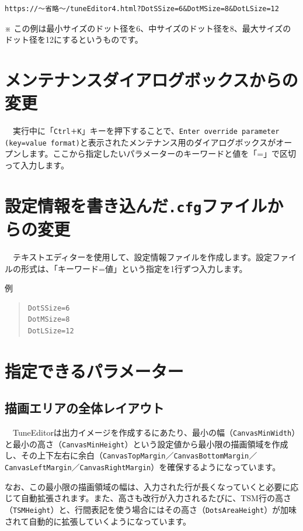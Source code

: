 \begin{verbatim}
https://〜省略〜/tuneEditor4.html?DotSSize=6&DotMSize=8&DotLSize=12
\end{verbatim}

※ この例は最小サイズのドット径を6、中サイズのドット径を8、最大サイズのドット径を12にするというものです。


\section{メンテナンスダイアログボックスからの変更}

　実行中に「\texttt{Ctrl＋K}」キーを押下することで、\texttt{Enter override parameter (key=value format)}と表示されたメンテナンス用のダイアログボックスがオープンします。ここから指定したいパラメーターのキーワードと値を「=」で区切って入力します。


\section{設定情報を書き込んだ\texttt{.cfg}ファイルからの変更}

　テキストエディターを使用して、設定情報ファイルを作成します。設定ファイルの形式は、「\textsf{キーワード}=\textsf{値}」という指定を1行ずつ入力します。

\textsf{例}
\begin{quote}
\begin{verbatim}
DotSSize=6
DotMSize=8
DotLSize=12
\end{verbatim}
\end{quote}


\section{指定できるパラメーター}\label{Parameters}

\subsection{描画エリアの全体レイアウト}

　TuneEditorは出力イメージを作成するにあたり、最小の幅（\texttt{CanvasMinWidth}）と最小の高さ（\texttt{CanvasMinHeight}）という設定値から\textsf{最小限の描画領域}を作成し、その上下左右に余白（\texttt{CanvasTopMargin}／\texttt{CanvasBottomMargin}／\texttt{CanvasLeftMargin}／\texttt{CanvasRightMargin}）を確保するようになっています。

なお、この最小限の描画領域の幅は、入力された行が長くなっていくと必要に応じて自動拡張されます。また、高さも改行が入力されるたびに、TSM行の高さ（\texttt{TSMHeight}）と、行間表記を使う場合にはその高さ（\texttt{DotsAreaHeight}）が加味されて自動的に拡張していくようになっています。

